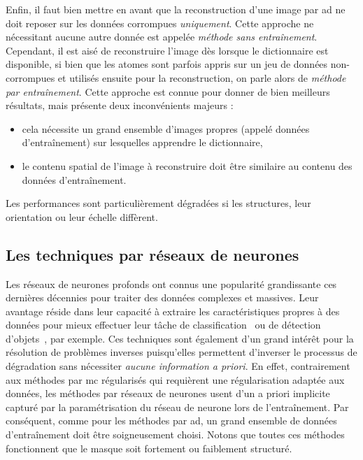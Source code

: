 Enfin, il faut bien mettre en avant que la reconstruction d'une image par \gls{ad} ne doit reposer sur les données corrompues \emph{uniquement}. Cette approche ne nécessitant aucune autre donnée est appelée \emph{méthode sans entraînement}. Cependant, il est aisé de reconstruire l'image dès lorsque le dictionnaire est disponible, si bien que les atomes sont parfois appris sur un jeu de données non-corrompues et utilisés ensuite pour la reconstruction, on parle alors de \emph{méthode par entraînement}. Cette approche est connue pour donner de bien meilleurs résultats, mais présente deux inconvénients majeurs :
\begin{itemize}
    \item cela nécessite un grand ensemble d'images propres (appelé données d'entraînement) sur lesquelles apprendre le dictionnaire,
    \item le contenu spatial de l'image à reconstruire doit être similaire au contenu des données d'entraînement.
\end{itemize}
Les performances sont particulièrement dégradées si les structures, leur orientation ou leur échelle diffèrent.


\subsection{Les techniques par réseaux de neurones}\label{sec-methodes-convnets}

Les réseaux de neurones profonds ont connus une popularité grandissante ces dernières décennies pour traiter des données complexes et massives. Leur avantage réside dans leur capacité à extraire les caractéristiques propres à des données pour mieux effectuer leur tâche de classification~\cite{lecun1989backpropagation} ou de détection d'objets~\cite{szegedy2013deep, zhao2019object}, par exemple. Ces techniques sont également d'un grand intérêt pour la résolution de problèmes inverses puisqu'elles permettent d'inverser le processus de dégradation sans nécessiter \emph{aucune information a priori}. En effet, contrairement aux méthodes par \gls{mc} régularisés qui requièrent une régularisation adaptée aux données, les méthodes par réseaux de neurones usent d'un a priori implicite capturé par la paramétrisation du réseau de neurone lors de l'entraînement. Par conséquent, comme pour les méthodes par \gls{ad}, un grand ensemble de données d'entraînement doit être soigneusement choisi. Notons que toutes ces méthodes fonctionnent que le masque soit fortement ou faiblement structuré.

